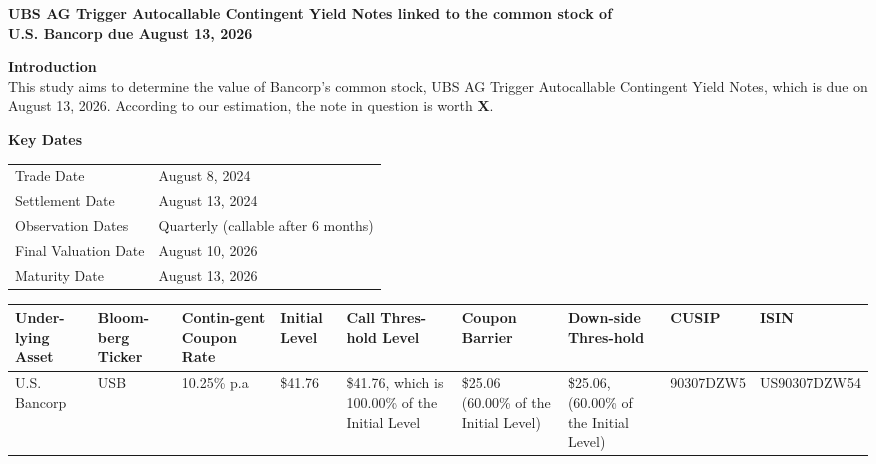 \documentclass[12pt]{article}
\begin{document}
{\large \textbf{UBS AG Trigger Autocallable Contingent Yield Notes linked to the common stock of}\\
\textbf{U.S. Bancorp due August 13, 2026}}

\vspace{0.5cm}

\textbf{Introduction}\\
This study aims to determine the value of Bancorp's common stock, UBS AG Trigger Autocallable Contingent Yield Notes, which is due on August 13, 2026. According to our estimation, the note in question is worth \textbf{X}.

\vspace{0.3cm}
\textbf{Key Dates}\\
\begin{tabular}{ll}
Trade Date & August 8, 2024 \\
Settlement Date & August 13, 2024 \\
Observation Dates & Quarterly (callable after 6 months) \\
Final Valuation Date & August 10, 2026 \\
Maturity Date & August 13, 2026 \\
\end{tabular}

\vspace{0.3cm}
\begin{tabular}{|p{1.5cm}|p{1.5cm}|p{1.5cm}|p{1.5cm}|p{1.5cm}|p{1.5cm}|p{1.5cm}|p{1.5cm}|p{1.5cm}|}
\hline
\textbf{Under-lying Asset} & \textbf{Bloom-berg Ticker} & \textbf{Contin-gent Coupon Rate} & \textbf{Initial Level} & \textbf{Call Thres-hold Level} & \textbf{Coupon Barrier} & \textbf{Down-side Thres-hold} & \textbf{CUSIP} & \textbf{ISIN} \\
\hline
U.S. Bancorp & USB & 10.25\% p.a & \$41.76 & \$41.76, which is 100.00\% of the Initial Level & \$25.06 (60.00\% of the Initial Level) & \$25.06, (60.00\% of the Initial Level) & 90307DZW5 & US90307DZW54 \\
\hline
\end{tabular}
\end{document}
